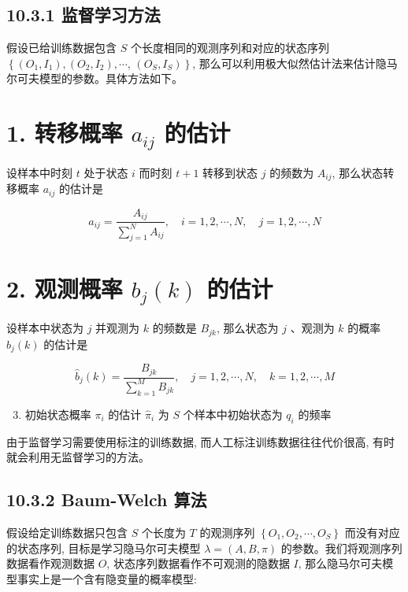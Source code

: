 \documentclass[10pt]{article}
\begin{document}
\subsection*{10.3.1 监督学习方法}
假设已给训练数据包含 $S$ 个长度相同的观测序列和对应的状态序列 $\left\{\left(O_{1}, I_{1}\right),\left(O_{2}, I_{2}\right), \cdots\right.$, $\left.\left(O_{S}, I_{S}\right)\right\}$, 那么可以利用极大似然估计法来估计隐马尔可夫模型的参数。具体方法如下。

\section*{1. 转移概率 $a_{i j}$ 的估计}
设样本中时刻 $t$ 处于状态 $i$ 而时刻 $t+1$ 转移到状态 $j$ 的频数为 $A_{i j}$, 那么状态转移概率 $a_{i j}$ 的估计是


\begin{equation*}
\hat{a}_{i j}=\frac{A_{i j}}{\sum_{j=1}^{N} A_{i j}}, \quad i=1,2, \cdots, N, \quad j=1,2, \cdots, N \tag{10.30}
\end{equation*}


\section*{2. 观测概率 $b_{j}(k)$ 的估计}
设样本中状态为 $j$ 并观测为 $k$ 的频数是 $B_{j k}$, 那么状态为 $j$ 、观测为 $k$ 的概率 $b_{j}(k)$ 的估计是


\begin{equation*}
\hat{b}_{j}(k)=\frac{B_{j k}}{\sum_{k=1}^{M} B_{j k}}, \quad j=1,2, \cdots, N, \quad k=1,2, \cdots, M \tag{10.31}
\end{equation*}


\begin{enumerate}
  \setcounter{enumi}{2}
  \item 初始状态概率 $\pi_{i}$ 的估计 $\hat{\pi}_{i}$ 为 $S$ 个样本中初始状态为 $q_{i}$ 的频率
\end{enumerate}

由于监督学习需要使用标注的训练数据, 而人工标注训练数据往往代价很高, 有时就会利用无监督学习的方法。

\subsection*{10.3.2 Baum-Welch 算法}
假设给定训练数据只包含 $S$ 个长度为 $T$ 的观测序列 $\left\{O_{1}, O_{2}, \cdots, O_{S}\right\}$ 而没有对应的状态序列, 目标是学习隐马尔可夫模型 $\lambda=(A, B, \pi)$ 的参数。我们将观测序列数据看作观测数据 $O$, 状态序列数据看作不可观测的隐数据 $I$, 那么隐马尔可夫模型事实上是一个含有隐变量的概率模型:
\end{document}
